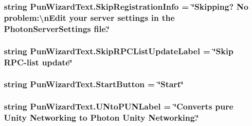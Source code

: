 \subsubsection[{\texorpdfstring{Skip\+Registration\+Info}{SkipRegistrationInfo}}]{\setlength{\rightskip}{0pt plus 5cm}string Pun\+Wizard\+Text.\+Skip\+Registration\+Info = \char`\"{}Skipping? No problem\+:\textbackslash{}n\+Edit your server settings in the Photon\+Server\+Settings file.\char`\"{}}\hypertarget{class_pun_wizard_text_a973c1a00148edb46e50c5f3402773faf}{}\label{class_pun_wizard_text_a973c1a00148edb46e50c5f3402773faf}
\subsubsection[{\texorpdfstring{Skip\+R\+P\+C\+List\+Update\+Label}{SkipRPCListUpdateLabel}}]{\setlength{\rightskip}{0pt plus 5cm}string Pun\+Wizard\+Text.\+Skip\+R\+P\+C\+List\+Update\+Label = \char`\"{}Skip R\+PC-\/list update\char`\"{}}\hypertarget{class_pun_wizard_text_a7847e10a84d1d79652a61a148beb650a}{}\label{class_pun_wizard_text_a7847e10a84d1d79652a61a148beb650a}
\subsubsection[{\texorpdfstring{Start\+Button}{StartButton}}]{\setlength{\rightskip}{0pt plus 5cm}string Pun\+Wizard\+Text.\+Start\+Button = \char`\"{}Start\char`\"{}}\hypertarget{class_pun_wizard_text_a69b56e0d631b99be36ca1fd0481c9af3}{}\label{class_pun_wizard_text_a69b56e0d631b99be36ca1fd0481c9af3}
\subsubsection[{\texorpdfstring{U\+Nto\+P\+U\+N\+Label}{UNtoPUNLabel}}]{\setlength{\rightskip}{0pt plus 5cm}string Pun\+Wizard\+Text.\+U\+Nto\+P\+U\+N\+Label = \char`\"{}Converts pure Unity Networking to Photon Unity Networking.\char`\"{}}\hypertarget{class_pun_wizard_text_a4b55e1319be8fbffe97ec49f0082a845}{}\label{class_pun_wizard_text_a4b55e1319be8fbffe97ec49f0082a845}
